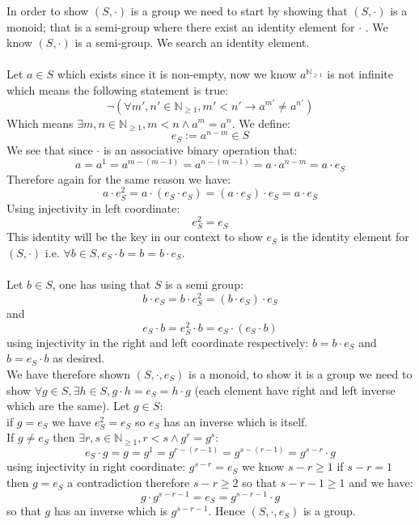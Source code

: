 \begin{solution}
    In order to show \( \left(S,\cdot\right) \) is a group we need to start by showing that \( \left(S,\cdot\right) \) is a monoid; that is a semi-group where there exist an identity element for \( \cdot \) . We know \( \left(S,\cdot\right) \) is a semi-group. We search an identity element.\\\\
    Let \( a\in S \) which exists since it is non-empty, now we know \( a^{\mathbb{N}_{\geq 1}} \) is not infinite which means the following statement is true:
    \[
        \neg\left(\forall m',n'\in\mathbb{N}_{\geq 1}, m'< n'\rightarrow a^{m'}\neq a^{n'}\right)
    \]
    Which means \( \exists m,n\in\mathbb{N}_{\geq 1}, m< n\wedge a^m=a^n \). We define:
    \[
        e_S:=a^{n-m}\in S
    \]
    We see that since \( \cdot \) is an associative binary operation that:
    \[
        a=a^1=a^{m-\left(m-1\right)}=a^{n-\left(m-1\right)}=a\cdot a^{n-m}=a\cdot e_S
    \]
    Therefore again for the same reason we have:
    \[
        a\cdot e_S^2=a\cdot \left(e_S\cdot e_S\right)=\left(a\cdot e_S\right)\cdot e_S=a\cdot e_S
    \]
    Using injectivity in left coordinate:
    \[
        e_S^2=e_S
    \]
    This identity will be the key in our context to show \( e_S \) is the identity element for \( \left(S,\cdot\right) \) i.e. \( \forall b\in S, e_S\cdot b=b=b\cdot e_S \).\\\\
    Let \( b\in S \), one has using that \( S \) is a semi group:
    \[
        b\cdot e_S=b\cdot e_S^2=\left(b\cdot e_S\right)\cdot e_S
    \]
    and
    \[
        e_S\cdot b=e_S^2\cdot b=e_S\cdot\left(e_S\cdot b\right)
    \]
    using injectivity in the right and left coordinate respectively: \( b=b\cdot e_S \) and \( b=e_S\cdot b \) as desired.\\
    We have therefore shown \( \left(S,\cdot,e_S\right) \) is a monoid, to show it is a group we need to show \( \forall g\in S,\exists h\in S,g\cdot h=e_S=h\cdot g \) (each element have right and left inverse which are the same). Let \( g\in S \):\\
    if \( g=e_S \) we have \( e_S^2=e_S \) so \( e_S \) has an inverse which is itself. \\
    If \( g\neq e_S \) then \( \exists r,s\in\mathbb{N}_{\geq 1}, r< s\wedge g^r=g^s \):
    \[
        e_S\cdot g=g=g^1=g^{r-\left(r-1\right)}=g^{s-\left(r-1\right)}=g^{s-r}\cdot g
    \]
    using injectivity in right coordinate: \( g^{s-r}=e_S \) we know \( s-r\geq 1 \) if \( s-r=1 \) then \( g=e_S \) a contradiction therefore \( s-r\geq 2 \) so that \( s-r-1\geq 1 \) and we have:
    \[
        g\cdot g^{s-r-1}=e_S=g^{s-r-1}\cdot g
    \]
    so that \( g \) has an inverse which is \( g^{s-r-1} \). Hence \( \left(S,\cdot,e_S\right) \) is a group.
\end{solution}
